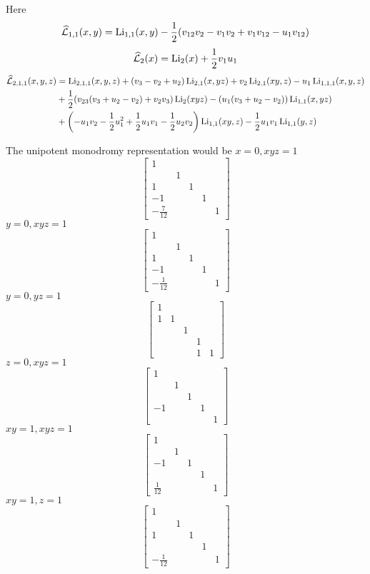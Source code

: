\documentclass[main]{subfiles}
\begin{document}
Here
\[\widehat{\mathcal L}_{1,1}(x,y)=\operatorname{Li}_{1,1}(x,y)-\frac{1}{2}(v_{12} v_2-v_1 v_2 + v_1 v_{12} - u_1 v_{12})\]
\[\widehat{\mathcal L}_{2}(x)=\operatorname{Li}_{2}(x)+\frac{1}{2}v_1u_1\]
\begin{align*}
\widehat{\mathcal L}_{2,1,1}(x,y,z)&=\operatorname{Li}_{2,1,1}(x,y,z) + (v_3 - v_2 + u_2) \operatorname{Li}_{2, 1}(x,yz) + v_2 \operatorname{Li}_{2, 1}(xy,z) - u_1 \operatorname{Li}_{1, 1, 1}(x,y,z) \\
&+  \frac{1}{2} (v_{23} (v_3 + u_2 - v_2) + v_2 v_3) \operatorname{Li}_{2}(xyz) - (u_1 (v_3 + u_2 - v_2)) \operatorname{Li}_{1, 1}(x,yz)\\
&+ \left(-u_1 v_2 - \frac{1}{2} u_1^2 +\frac{1}{2} u_1 v_1 - \frac{1}{2} u_2 v_2\right) \operatorname{Li}_{1,1}(xy,z) - \frac{1}{2} u_1 v_1\operatorname{Li}_{1, 1}(y,z)
\end{align*}

The unipotent monodromy representation would be
$x=0,xyz=1$
\[
\begin{bmatrix}
1\\
&1\\
1&&1\\
-1&&&1\\
-\frac{7}{12}&&&&1
\end{bmatrix}
\]
$y=0,xyz=1$
\[
\begin{bmatrix}
1\\
&1\\
1&&1\\
-1&&&1\\
-\frac{1}{12}&&&&1
\end{bmatrix}
\]
$y=0,yz=1$
\[
\begin{bmatrix}
1\\
1&1\\
&&1\\
&&&1\\
&&&1&1
\end{bmatrix}
\]
$z=0,xyz=1$
\[
\begin{bmatrix}
1\\
&1\\
&&1\\
-1&&&1\\
&&&&1
\end{bmatrix}
\]
$xy=1,xyz=1$
\[
\begin{bmatrix}
1\\
&1\\
-1&&1\\
&&&1\\
\frac{1}{12}&&&&1
\end{bmatrix}
\]
$xy=1,z=1$
\[
\begin{bmatrix}
1\\
&1\\
1&&1\\
&&&1\\
-\frac{1}{12}&&&&1
\end{bmatrix}
\]
\end{document}
